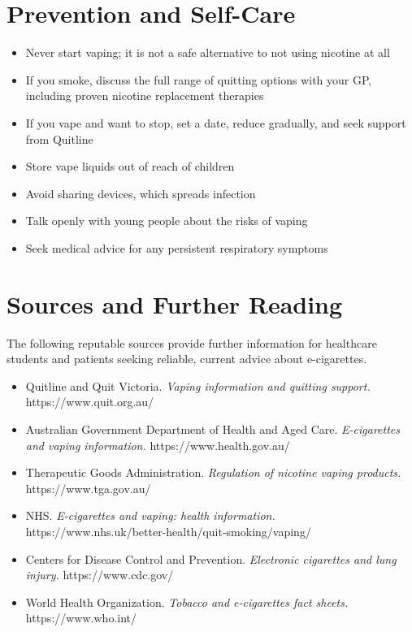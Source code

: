 \section*{Prevention and Self-Care}
\begin{itemize}
    \item Never start vaping; it is not a safe alternative to not using nicotine at all
    \item If you smoke, discuss the full range of quitting options with your GP, including proven nicotine replacement therapies
    \item If you vape and want to stop, set a date, reduce gradually, and seek support from Quitline
    \item Store vape liquids out of reach of children
    \item Avoid sharing devices, which spreads infection
    \item Talk openly with young people about the risks of vaping
    \item Seek medical advice for any persistent respiratory symptoms
\end{itemize}

\section*{Sources and Further Reading}
The following reputable sources provide further information for healthcare students and patients seeking reliable, current advice about e-cigarettes.
\begin{itemize}
    \item Quitline and Quit Victoria. \textit{Vaping information and quitting support.} https://www.quit.org.au/
    \item Australian Government Department of Health and Aged Care. \textit{E-cigarettes and vaping information.} https://www.health.gov.au/
    \item Therapeutic Goods Administration. \textit{Regulation of nicotine vaping products.} https://www.tga.gov.au/
    \item NHS. \textit{E-cigarettes and vaping: health information.} https://www.nhs.uk/better-health/quit-smoking/vaping/
    \item Centers for Disease Control and Prevention. \textit{Electronic cigarettes and lung injury.} https://www.cdc.gov/
    \item World Health Organization. \textit{Tobacco and e-cigarettes fact sheets.} https://www.who.int/
\end{itemize}
